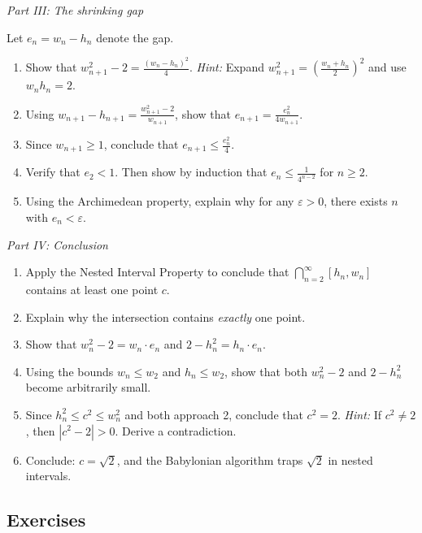\documentclass[
  10pt,
  letterpaper,
]{scrbook}
\begin{document}
\emph{Part III: The shrinking gap}

Let \(e_n = w_n - h_n\) denote the gap.

\begin{enumerate}
\def\labelenumi{(\alph{enumi})}
\setcounter{enumi}{7}
\item
  Show that \(w_{n+1}^2 - 2 = \frac{(w_n - h_n)^2}{4}\). \emph{Hint:}
  Expand \(w_{n+1}^2 = \left(\frac{w_n + h_n}{2}\right)^2\) and use
  \(w_n h_n = 2\).
\item
  Using \(w_{n+1} - h_{n+1} = \frac{w_{n+1}^2 - 2}{w_{n+1}}\), show that
  \(e_{n+1} = \frac{e_n^2}{4w_{n+1}}\).
\item
  Since \(w_{n+1} \geq 1\), conclude that
  \(e_{n+1} \leq \frac{e_n^2}{4}\).
\item
  Verify that \(e_2 < 1\). Then show by induction that
  \(e_n \leq \frac{1}{4^{n-2}}\) for \(n \geq 2\).
\item
  Using the Archimedean property, explain why for any
  \(\varepsilon > 0\), there exists \(n\) with \(e_n < \varepsilon\).
\end{enumerate}

\emph{Part IV: Conclusion}

\begin{enumerate}
\def\labelenumi{(\alph{enumi})}
\setcounter{enumi}{12}
\item
  Apply the Nested Interval Property to conclude that
  \(\bigcap_{n=2}^{\infty} [h_n, w_n]\) contains at least one point
  \(c\).
\item
  Explain why the intersection contains \emph{exactly} one point.
\item
  Show that \(w_n^2 - 2 = w_n \cdot e_n\) and
  \(2 - h_n^2 = h_n \cdot e_n\).
\item
  Using the bounds \(w_n \leq w_2\) and \(h_n \leq w_2\), show that both
  \(w_n^2 - 2\) and \(2 - h_n^2\) become arbitrarily small.
\item
  Since \(h_n^2 \leq c^2 \leq w_n^2\) and both approach 2, conclude that
  \(c^2 = 2\). \emph{Hint:} If \(c^2 \neq 2\), then \(|c^2 - 2| > 0\).
  Derive a contradiction.
\item
  Conclude: \(c = \sqrt{2}\), and the Babylonian algorithm traps
  \(\sqrt{2}\) in nested intervals.
\end{enumerate}

\subsection{Exercises}\label{exercises-2}
\end{document}

